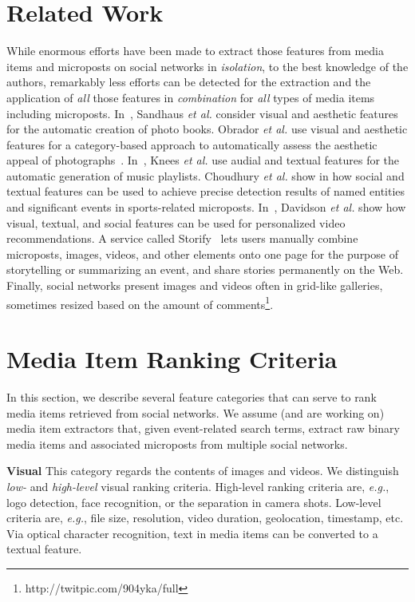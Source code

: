 \documentclass{article}
\begin{document}
\section{Related Work}
While enormous efforts have been made to extract those features
from media items and microposts on social networks in \emph{isolation},
to the best knowledge of the authors, remarkably less efforts 
can be detected for the extraction and the application
of \emph{all} those features in \emph{combination}
for \emph{all} types of media items including microposts.
In~\cite{Photo2011}, Sandhaus \emph{et al.} consider visual and
aesthetic features for the automatic creation of photo books.
Obrador \emph{et al.} use visual and aesthetic features
for a category-based approach to automatically assess
the aesthetic appeal of photographs~\cite{Photo2012}.
In~\cite{Playlist2006}, Knees \emph{et al.} use audial and textual
features for the automatic generation of music playlists.
Choudhury \emph{et al.} show in \cite{Sports2011} how social and textual
features can be used to achieve precise detection results 
of named entities and significant events in sports-related microposts.
In~\cite{YouTube2010}, Davidson \emph{et al.} show how visual,
textual, and social features can be used for personalized video recommendations.
A service called Storify~\cite{Storify2011} lets users manually combine
microposts, images, videos, and other elements onto one page for the purpose
of storytelling or summarizing an event,
and share stories permanently on the Web.
Finally, social networks present images and videos
often in grid-like galleries, sometimes resized
based on the amount of comments\footnote{http://twitpic.com/904yka/full}.

\section{Media Item Ranking Criteria}
In this section, we describe several feature categories that can serve to rank
media items retrieved from social networks. 
We assume (and are working on) media item extractors that,
given event-related search terms,
extract raw binary media items and associated microposts
from multiple social networks.

\noindent \textbf{Visual}
This category regards the contents of images and videos.
We distinguish \emph{low-} and \emph{high-level} visual ranking criteria.
High-level ranking criteria are, \emph{e.g.}, logo detection,
face recognition, or the separation in camera shots.
Low-level criteria are, \emph{e.g.}, file size, resolution,
video duration, geolocation, timestamp, etc.
Via optical character recognition,
text in media items can be converted to a textual feature.
\end{document}
